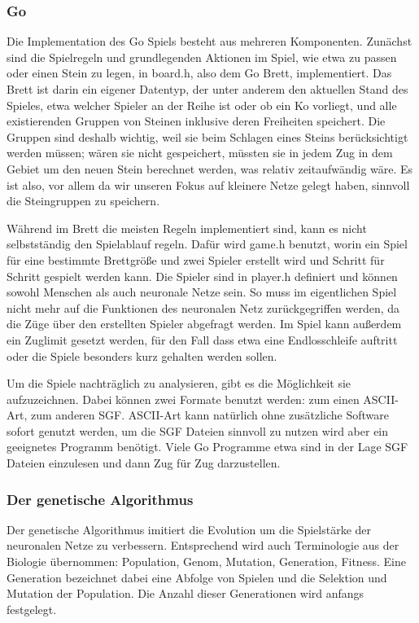 \subsubsection{Go}

Die Implementation des Go Spiels besteht aus mehreren Komponenten. Zunächst sind
die Spielregeln und grundlegenden Aktionen im Spiel, wie etwa zu passen oder
einen Stein zu legen, in board.h, also dem Go Brett, implementiert. Das Brett
ist darin ein eigener Datentyp, der unter anderem den aktuellen Stand des
Spieles, etwa welcher Spieler an der Reihe ist oder ob ein Ko vorliegt, und alle
existierenden Gruppen von Steinen inklusive deren Freiheiten speichert. Die
Gruppen sind deshalb wichtig, weil sie beim Schlagen eines Steins berücksichtigt
werden müssen; wären sie nicht gespeichert, müssten sie in jedem Zug in dem
Gebiet um den neuen Stein berechnet werden, was relativ zeitaufwändig wäre. Es
ist also, vor allem da wir unseren Fokus auf kleinere Netze gelegt haben,
sinnvoll die Steingruppen zu speichern. 

Während im Brett die meisten Regeln implementiert sind, kann es nicht
selbstständig den Spielablauf regeln. Dafür wird game.h benutzt, worin ein Spiel
für eine bestimmte Brettgröße und zwei Spieler erstellt wird und Schritt für
Schritt gespielt werden kann. Die Spieler sind in player.h definiert und können
sowohl Menschen als auch neuronale Netze sein. So muss im eigentlichen Spiel
nicht mehr auf die Funktionen des neuronalen Netz zurückgegriffen werden, da die
Züge über den erstellten Spieler abgefragt werden. Im Spiel kann außerdem ein
Zuglimit gesetzt werden, für den Fall dass etwa eine Endlosschleife auftritt
oder die Spiele besonders kurz gehalten werden sollen. 

Um die Spiele nachträglich zu analysieren, gibt es die Möglichkeit sie
aufzuzeichnen. Dabei können zwei Formate benutzt werden: zum einen ASCII-Art,
zum anderen SGF. ASCII-Art kann natürlich ohne zusätzliche Software sofort
genutzt werden, um die SGF Dateien sinnvoll zu nutzen wird aber ein geeignetes
Programm benötigt. Viele Go Programme etwa sind in der Lage SGF Dateien
einzulesen und dann Zug für Zug darzustellen. 

\subsubsection{Der genetische Algorithmus}

Der genetische Algorithmus imitiert die Evolution um die Spielstärke der
neuronalen Netze zu verbessern. Entsprechend wird auch Terminologie aus der
Biologie übernommen: Population, Genom, Mutation, Generation, Fitness. Eine
Generation bezeichnet dabei eine Abfolge von Spielen und die Selektion und
Mutation der Population. Die Anzahl dieser Generationen wird anfangs festgelegt.

